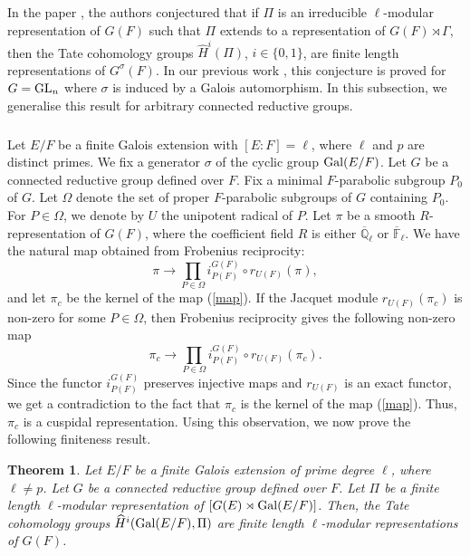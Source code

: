\documentclass[10pt, reqno]{amsart}
\theoremstyle{plain}
\numberwithin{equation}{section} \newcommand{\di}{\operatorname{dim}}
\newtheorem{theorem}{Theorem}[subsection]
\begin{document}
\subsection{}
In the paper \cite[Conjecture 6.1]{Treumann_Venkatesh_linkage}, the
authors conjectured that if $\Pi$ is an irreducible $\ell$-modular
representation of $G(F)$ such that $\Pi$ extends to a representation
of $G(F)\rtimes \Gamma$, then the Tate cohomology groups
$\widehat{H}^i(\Pi)$, $i\in\{0,1\}$, are finite length representations
of $G^\sigma(F)$. In our previous work \cite[Proposition
5.5]{nadimpalli2024tate}, this conjecture is proved for $G={\rm GL}_n$
where $\sigma$ is induced by a Galois automorphism. In this
subsection, we generalise this result for arbitrary connected
reductive groups.
\subsubsection{}\label{local_bc_setup}
Let $E/F$ be a finite Galois extension with $[E:F]=\ell$, where $\ell$ and
$p$ are distinct primes. We fix a generator $\sigma$ of the cyclic
group ${\rm Gal}(E/F)$. Let $G$ be a connected reductive group defined
over $F$. Fix a minimal $F$-parabolic subgroup $P_0$ of $G$. Let
$\Omega$ denote the set of 
proper $F$-parabolic subgroups of
$G$ containing $P_0$. For $P\in \Omega$, we denote by $U$ the 
unipotent radical of $P$. 
Let $\pi$ be a smooth $R$-representation of
$G(F)$, where the coefficient field $R$ is either
$\overline{\mathbb{Q}}_\ell$ or $\overline{\mathbb{F}}_\ell$. We have the
natural map obtained from Frobenius reciprocity:
\begin{equation}\label{map}
\pi \longrightarrow \prod_{P\in \Omega}i_{P(F)}^{G(F)}\circ r_{U(F)}(\pi),
\end{equation}
and let $\pi_c$ be the kernel of the map (\ref{map}). If the Jacquet
module $r_{U(F)}(\pi_c)$ is non-zero for some $P\in \Omega$,
then Frobenius reciprocity gives the following non-zero map
\begin{equation}\label{ker_cusp_cusp}
\pi_c \longrightarrow \prod_{P\in \Omega} i_{P(F)}^{G(F)}\circ r_{U(F)}(\pi_c).
\end{equation}
Since the functor $i_{P(F)}^{G(F)}$ preserves
injective maps and $r_{U(F)}$ is an exact functor,  we get a
contradiction to the fact that $\pi_c$ is the
kernel of the map (\ref{map}). Thus, $\pi_c$ is a cuspidal
representation. Using this observation, we now prove the following
finiteness result.
\begin{theorem}\label{Tate_finite_length}
Let $E/F$ be a finite Galois extension of prime degree $\ell$, where
$\ell\ne p$. Let $G$ be a connected reductive group defined
over $F$. Let $\Pi$ be a finite length 
 $\ell$-modular representation of $[G(E)\rtimes {\rm Gal}(E/F)]$. Then, the Tate
cohomology groups $\widehat{H}^i({\rm Gal}(E/F), \Pi)$ are
finite length $\ell$-modular 
representations of $G(F)$.
\end{theorem}
\end{document}
